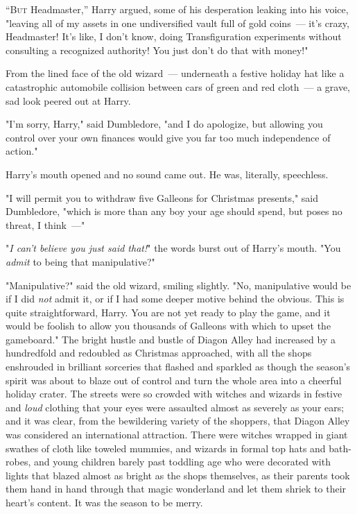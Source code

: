 
\lettrine{“B}{ut} Headmaster,''
Harry argued, some of his desperation leaking into his voice, "leaving all of
my assets in one undiversified vault full of gold coins~--- it's crazy,
Headmaster! It's like, I don't know, doing Transfiguration experiments without
consulting a recognized authority! You just don't do that with money!"

From the lined face of the old wizard~--- underneath a festive holiday hat like a
catastrophic automobile collision between cars of green and red cloth~--- a
grave, sad look peered out at Harry.

"I'm sorry, Harry," said Dumbledore, "and I do apologize, but allowing you
control over your own finances would give you far too much independence of
action."

Harry's mouth opened and no sound came out. He was, literally, speechless.

"I will permit you to withdraw five Galleons for Christmas presents," said
Dumbledore, "which is more than any boy your age should spend, but poses no
threat, I think~---"

"\emph{I can't believe you just said that!}" the words burst out of Harry's
mouth. "You \emph{admit} to being that manipulative?"

"Manipulative?" said the old wizard, smiling slightly. "No, manipulative would
be if I did \emph{not} admit it, or if I had some deeper motive behind the
obvious. This is quite straightforward, Harry. You are not yet ready to play
the game, and it would be foolish to allow you thousands of Galleons with which
to upset the gameboard."
\sbreak
The bright hustle and bustle of Diagon Alley had increased by a hundredfold and
redoubled as Christmas approached, with all the shops enshrouded in brilliant
sorceries that flashed and sparkled as though the season's spirit was about to
blaze out of control and turn the whole area into a cheerful holiday crater.
The streets were so crowded with witches and wizards in festive and \emph{loud}
clothing that your eyes were assaulted almost as severely as your ears; and it
was clear, from the bewildering variety of the shoppers, that Diagon Alley was
considered an international attraction. There were witches wrapped in giant
swathes of cloth like toweled mummies, and wizards in formal top hats and
bath-robes, and young children barely past toddling age who were decorated with
lights that blazed almost as bright as the shops themselves, as their parents
took them hand in hand through that magic wonderland and let them shriek to
their heart's content. It was the season to be merry.

